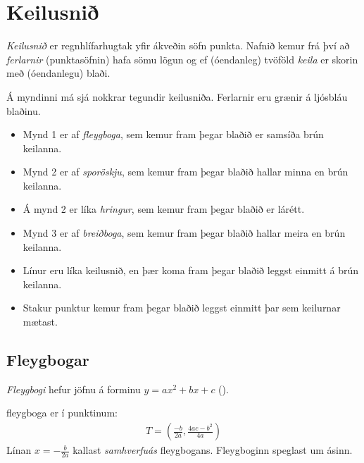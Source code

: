 \documentclass[a4paper,10pt,icelandic]{sphinxmanual}
\begin{document}
\section{Keilusnið}
\label{\detokenize{Kafli03:keilusni}}
\textit{Keilusnið} er regnhlífarhugtak yfir ákveðin söfn punkta.
Nafnið kemur frá því að \textit{ferlarnir} (punktasöfnin) hafa sömu lögun og ef (óendanleg) tvöföld \textit{keila} er skorin með (óendanlegu) blaði.

\begin{figure}[htbp]
\centering

\noindent{}
\end{figure}

Á myndinni má sjá nokkrar tegundir keilusniða. Ferlarnir eru grænir á ljósbláu blaðinu.
\begin{itemize}
\item {} 
Mynd 1 er af \textit{fleygboga}, sem kemur fram þegar blaðið er samsíða brún keilanna.

\item {} 
Mynd 2 er af \textit{sporöskju}, sem kemur fram þegar blaðið hallar minna en brún keilanna.

\item {} 
Á mynd 2 er líka \textit{hringur}, sem kemur fram þegar blaðið er lárétt.

\item {} 
Mynd 3 er af \textit{breiðboga}, sem kemur fram þegar blaðið hallar meira en brún keilanna.

\item {} 
Línur eru líka keilusnið, en þær koma fram þegar blaðið leggst einmitt á brún keilanna.

\item {} 
Stakur punktur kemur fram þegar blaðið leggst einmitt þar sem keilurnar mætast.

\end{itemize}


\subsection{Fleygbogar}
\label{\detokenize{Kafli03:fleygbogar}}
\textit{Fleygbogi} hefur jöfnu á forminu \(y=ax^2+bx+c\) ({\hyperref[\detokenize{Kafli06:s-annarsstigs}]{}}).

 fleygboga er í punktinum:
\begin{equation*}
\begin{split}T=\left(\frac{-b}{2a},\frac{4ac-b^2}{4a} \right)\end{split}
\end{equation*}
Línan \(x=-\frac{b}{2a}\) kallast \textit{samhverfuás} fleygbogans.
Fleygboginn speglast um ásinn.
\end{document}

